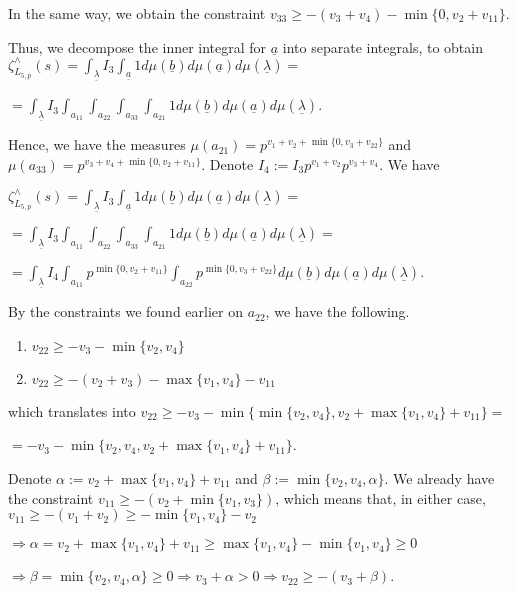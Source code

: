 \documentclass{article}
\begin{document}
In the same way, we obtain the constraint $v_{33}\geq{-(v_{3}+v_{4})-\min\{0,v_{2}+v_{11}\}}$.

Thus, we decompose the inner integral for $\underline{a}$ into separate integrals, to obtain $\zeta_{L_{5,p}}^{\wedge}(s)=\displaystyle\int_{\underline\lambda}I_{3}\int_{\underline{a}}1d\mu(\underline{b})d\mu(\underline{a})d\mu(\underline{\lambda})=$

$=\displaystyle\int_{\underline\lambda}I_{3}\int_{a_{11}}\int_{a_{22}}\int_{a_{33}}\int_{a_{21}}1d\mu(\underline{b})d\mu(\underline{a})d\mu(\underline{\lambda})$.

Hence, we have the measures $\mu(a_{21})=p^{v_{1}+v_{2}+\min\{0,v_{3}+v_{22}\}}$ and $\mu(a_{33})=p^{v_{3}+v_{4}+\min\{0,v_{2}+v_{11}\}}$.
Denote $I_{4}:=I_{3}p^{v_{1}+v_{2}}p^{v_{3}+v_{4}}$. We have 

$\zeta_{L_{5,p}}^{\wedge}(s)=\displaystyle\int_{\underline\lambda}I_{3}\int_{\underline{a}}1d\mu(\underline{b})d\mu(\underline{a})d\mu(\underline{\lambda})=$

$=\displaystyle\int_{\underline\lambda}I_{3}\int_{a_{11}}\int_{a_{22}}\int_{a_{33}}\int_{a_{21}}1d\mu(\underline{b})d\mu(\underline{a})d\mu(\underline{\lambda})=$

$=\displaystyle\int_{\underline\lambda}I_{4}\int_{a_{11}}p^{\min\{0,v_{2}+v_{11}\}}\int_{a_{22}}p^{\min\{0,v_{3}+v_{22}\}}d\mu(\underline{b})d\mu(\underline{a})d\mu(\underline{\lambda}).$

By the constraints we found earlier on $a_{22}$, we have the following.
\begin{enumerate}
    \item $v_{22}\geq{-v_{3}-\min\{v_{2},v_{4}\}}$
    \item $v_{22}\geq{-(v_{2}+v_{3})-\max\{v_{1},v_{4}\}-v_{11}}$
\end{enumerate}
which translates into $v_{22}\geq{-v_{3}-\min\{\min\{v_{2},v_{4}\},v_{2}+\max\{v_{1},v_{4}\}+v_{11}\}}=$

$=-v_{3}-\min\{v_{2},v_{4},v_{2}+\max\{v_{1},v_{4}\}+v_{11}\}$.

Denote $\alpha:=v_{2}+\max\{v_{1},v_{4}\}+v_{11}$ and $\beta:=\min\{v_{2},v_{4},\alpha\}$. We already have the constraint $v_{11}\geq{-(v_{2}+\min\{v_{1},v_{3}\})}$, which means that, in either case, $v_{11}\geq{-(v_{1}+v_{2})}\geq{-\min\{v_{1},v_{4}\}-v_{2}}$

$\Rightarrow{\alpha=v_{2}+\max\{v_{1},v_{4}\}+v_{11}\geq{\max\{v_{1},v_{4}\}-\min\{v_{1},v_{4}\}}}\geq{0}$

$\Rightarrow{\beta=\min\{v_{2},v_{4},\alpha\}}\geq{0}\Rightarrow{v_{3}+\alpha>0}\Rightarrow{v_{22}\geq{-(v_{3}+\beta)}}$. 
\end{document}
